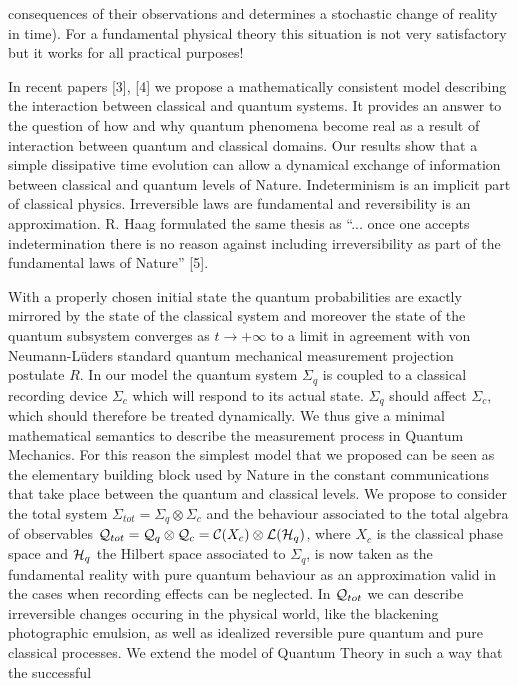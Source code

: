 consequences of their observations and determines a stochastic change
of reality in time).
For a fundamental physical
theory this situation is not very satisfactory but it works for all
practical purposes!\par
In recent papers [3], [4] we propose a mathematically consistent
model describing the interaction between classical and quantum
systems. It provides an answer to the question of how and why quantum
phenomena become real as a result of interaction between quantum and
classical domains. Our results show that a simple dissipative time
evolution can allow a dynamical exchange of information between
classical and quantum levels of Nature. Indeterminism is an implicit
part of classical physics. Irreversible laws are fundamental and
reversibility is an approximation. R. Haag formulated the same thesis
as ``... once one accepts indetermination there is no reason against
including irreversibility as part of the fundamental laws of Nature''
[5].\par
With a properly chosen initial state the quantum probabilities are
exactly mirrored by the state of the classical system and moreover
the state of the quantum subsystem converges as $t \to + \infty$
to a limit in agreement with von Neumann-L\"uders standard quantum
mechanical measurement projection postulate $R$. In our model the
quantum system $\Sigma_q$ is coupled to a classical recording
device $\Sigma_c$ which will respond to its actual state. $\Sigma_q$
should affect $\Sigma_c$, which should therefore be treated dynamically.
We thus give a minimal mathematical semantics to describe the
measurement process in Quantum Mechanics. For this reason the simplest
model that we proposed can be seen as the elementary building block
used by Nature in the constant communications that take place between
the quantum and classical levels. We propose to consider the total
system $\Sigma_{tot} = \Sigma_q \otimes \Sigma_c$ and the behaviour
associated to the total algebra of observables ${\cal Q}_{tot} =
{\cal Q}_q \otimes {\cal Q}_c = {\cal C} (X_c) \otimes {\cal L}
({\cal H}_q)$, where $X_c$ is the classical phase space and
${\cal H}_q$ the Hilbert space associated to $\Sigma_q$, is now
taken as the fundamental reality with pure quantum behaviour as an
approximation valid in the cases when recording effects can be
neglected. In ${\cal Q}_{tot}$ we can describe irreversible changes
occuring in the physical world, like the blackening photographic
emulsion, as well as idealized reversible pure quantum
and pure classical processes.
We extend the model of Quantum Theory in such a way that the successful
